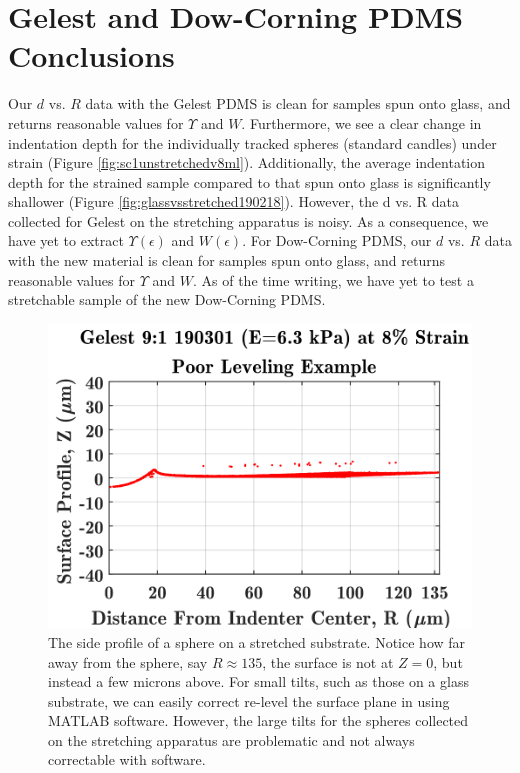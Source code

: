 \section{Gelest and Dow-Corning PDMS Conclusions} \label{sec:DataConclusions}
Our $ d $ vs. $ R $ data with the Gelest PDMS is clean for samples spun onto glass, and returns reasonable values for $ \Upsilon $ and $ W $. Furthermore, we see a clear change in indentation depth for the individually tracked spheres (standard candles) under strain (Figure \ref{fig:sc1unstretchedv8ml}). Additionally, the average indentation depth for the strained sample compared to that spun onto glass is significantly shallower (Figure \ref{fig:glassvsstretched190218}). However, the d vs. R data collected for Gelest on the stretching apparatus is noisy. As a consequence, we have yet to extract $ \Upsilon(\epsilon) $ and $ W(\epsilon) $. For Dow-Corning PDMS, our $ d $ vs. $ R $ data with the new material is clean for samples spun onto glass, and returns reasonable values for $ \Upsilon $ and $ W $. As of the time writing, we have yet to test a stretchable sample of the new Dow-Corning PDMS.
\begin{figure}[h!]
	\centering
	\includegraphics[width=.8\linewidth]{Chapters/Figures/190218G_tilted_axis_example}
	\caption[Side Collapse Tilt]{The side profile of a sphere on a stretched substrate. Notice how far away from the sphere, say $ R \approx 135 $, the surface is not at $ Z = 0 $, but instead a few microns above. For small tilts, such as those on a glass substrate, we can easily correct re-level the surface plane in using MATLAB software. However, the large tilts for the spheres collected on the stretching apparatus are problematic and not always correctable with software.}
	\label{fig:190218gtiltedaxisexample}
\end{figure}


